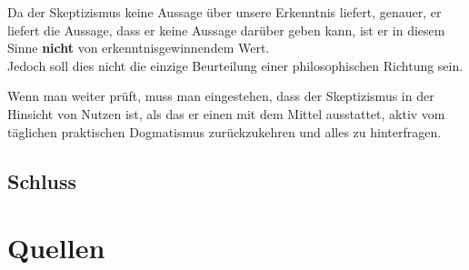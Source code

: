 \documentclass[11pt,a4paper]{article}
\begin{document}
Da der Skeptizismus keine Aussage über unsere Erkenntnis liefert, genauer, er liefert die Aussage, dass er keine Aussage darüber geben kann, ist er in diesem Sinne \textbf{nicht} von erkenntnisgewinnendem Wert.\\
Jedoch soll dies nicht die einzige Beurteilung einer philosophischen Richtung sein. 




Wenn man weiter prüft, muss man eingestehen, dass der Skeptizismus in der Hinsicht von Nutzen ist, als das er einen mit dem Mittel ausstattet, aktiv vom täglichen praktischen Dogmatismus zurückzukehren und alles zu hinterfragen.
	\subsection{Schluss}





\section*{Quellen}
\printbibliography
\end{document}
